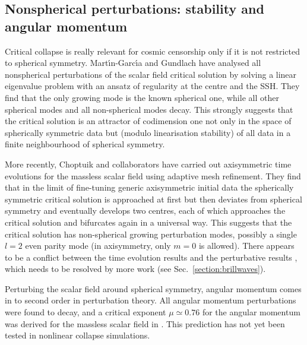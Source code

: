 \documentclass{article}
\begin{document}
\subsection{Nonspherical perturbations: stability and angular
  momentum}
\label{section:scalarnonspherical}

Critical collapse is really relevant for cosmic censorship only if it
is not restricted to spherical symmetry. Mart\'{\i}n-Garc\'{\i}a and
Gundlach \cite{MartinGundlach} have analysed all nonspherical
perturbations of the scalar field critical solution by solving a
linear eigenvalue problem with an ansatz of regularity at the centre
and the SSH. They find that the only growing mode is the known
spherical one, while all other spherical modes and all non-spherical
modes decay. This strongly suggests that the critical solution is an
attractor of codimension one not only in the space of spherically
symmetric data but (modulo linearisation stability) of all data in a
finite neighbourhood of spherical symmetry.

More recently, Choptuik and collaborators \cite{Choptuik_axisymmetry}
have carried out axisymmetric time evolutions for the massless scalar
field using adaptive mesh refinement. They find that in the limit of
fine-tuning generic axisymmetric initial data the spherically
symmetric critical solution is approached at first but then deviates
from spherical symmetry and eventually develops two centres, each of
which approaches the critical solution and bifurcates again in a
universal way. This suggests that the critical solution has
non-spherical growing perturbation modes, possibly a single $l=2$ even
parity mode (in axisymmetry, only $m=0$ is allowed). There appears to be a conflict between the time evolution
results \cite{Choptuik_axisymmetry} and the perturbative results
\cite{MartinGundlach}, which needs to be resolved by more work (see
Sec.~\ref{section:brillwaves}).

Perturbing the scalar field around spherical symmetry, angular
momentum comes in to second order in perturbation theory. All angular
momentum perturbations were found to decay, and a critical exponent
$\mu\simeq 0.76$ for the angular momentum was derived for the massless
scalar field in \cite{GarfinkleGundlachMartin}. This prediction has
not yet been tested in nonlinear collapse simulations. 

\end{document}
